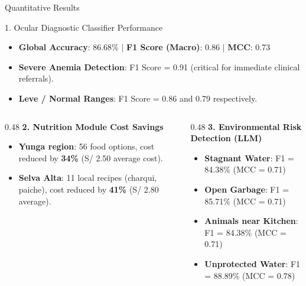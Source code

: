 \documentclass[aspectratio=169]{beamer}
\begin{document}
\begin{frame}{Quantitative Results}
    \begin{block}{1. Ocular Diagnostic Classifier Performance}
        \begin{itemize}
            \item \textbf{Global Accuracy}: 86.68\% $|$ \textbf{F1 Score (Macro)}: 0.86 $|$ \textbf{MCC}: 0.73
            \item \textbf{Severe Anemia Detection}: F1 Score = 0.91 (critical for immediate clinical referrals).
            \item \textbf{Leve / Normal Ranges}: F1 Score = 0.86 and 0.79 respectively.
        \end{itemize}
    \end{block}
    
    \begin{columns}[T]
        \begin{column}{0.48\textwidth}
            \textbf{2. Nutrition Module Cost Savings}
            \begin{itemize}
                \item \textbf{Yunga region}: 56 food options, cost reduced by \textbf{34\%} (S/ 2.50 average cost).
                \item \textbf{Selva Alta}: 11 local recipes (charqui, paiche), cost reduced by \textbf{41\%} (S/ 2.80 average).
            \end{itemize}
        \end{column}
        \begin{column}{0.48\textwidth}
            \textbf{3. Environmental Risk Detection (LLM)}
            \begin{itemize}
                \item \textbf{Stagnant Water}: F1 = 84.38\% (MCC = 0.71)
                \item \textbf{Open Garbage}: F1 = 85.71\% (MCC = 0.71)
                \item \textbf{Animals near Kitchen}: F1 = 84.38\% (MCC = 0.71)
                \item \textbf{Unprotected Water}: F1 = 88.89\% (MCC = 0.78)
            \end{itemize}
        \end{column}
    \end{columns}
\end{frame}
\end{document}
